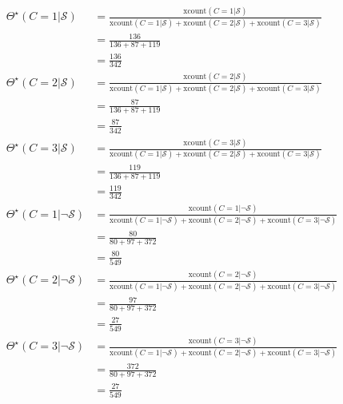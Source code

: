 \documentclass[review_Solutions]{subfiles}
\begin{document}
\begin{exercise}
\begin{boxedsolution}
\begin{align}
\Theta^\star(C=1 | \mathcal{S}) &= \frac{\mbox{xcount}(C=1| \mathcal{S})}{\mbox{xcount}(C=1| \mathcal{S}) + \mbox{xcount}(C=2| \mathcal{S})  + \mbox{xcount}(C=3 | \mathcal{S}) } \nonumber \\
&= \frac{136}{136+87+119} \nonumber \\
&= \frac{136}{342} \nonumber \\
\Theta^\star(C=2 | \mathcal{S}) &= \frac{\mbox{xcount}(C=2| \mathcal{S})}{\mbox{xcount}(C=1| \mathcal{S}) + \mbox{xcount}(C=2| \mathcal{S})  + \mbox{xcount}(C=3|  \mathcal{S}) } \nonumber \\
&= \frac{87}{136+87+119} \nonumber \\
&= \frac{87}{342} \nonumber \\
\Theta^\star(C=3 | \mathcal{S}) &= \frac{\mbox{xcount}(C=3| \mathcal{S})}{\mbox{xcount}(C=1| \mathcal{S}) + \mbox{xcount}(C=2| \mathcal{S})  + \mbox{xcount}(C=3 | \mathcal{S}) } \nonumber \\
&= \frac{119}{136+87+119} \nonumber \\
&= \frac{119}{342} \nonumber \\
\Theta^\star(C=1 | \neg \mathcal{S}) &= \frac{\mbox{xcount}(C=1| \neg\mathcal{S})}{\mbox{xcount}(C=1|\neg \mathcal{S}) + \mbox{xcount}(C=2| \neg\mathcal{S})  + \mbox{xcount}(C=3|\neg  \mathcal{S}) } \nonumber \\
&= \frac{80}{80 + 97 + 372} \nonumber \\
&= \frac{80}{549} \nonumber \\
\Theta^\star(C=2 | \neg \mathcal{S}) &= \frac{\mbox{xcount}(C=2| \neg\mathcal{S})}{\mbox{xcount}(C=1| \neg\mathcal{S}) + \mbox{xcount}(C=2| \neg\mathcal{S})  + \mbox{xcount}(C=3 |\neg \mathcal{S}) } \nonumber \\
&= \frac{97}{80 + 97 + 372} \nonumber \\
&= \frac{27}{549} \nonumber \\
\Theta^\star(C=3 | \neg \mathcal{S}) &= \frac{\mbox{xcount}(C=3| \neg\mathcal{S})}{\mbox{xcount}(C=1| \neg\mathcal{S}) + \mbox{xcount}(C=2| \neg\mathcal{S})  + \mbox{xcount}(C=3 | \neg\mathcal{S}) } \nonumber \\
&= \frac{372}{80 + 97 + 372} \nonumber \\
&= \frac{27}{549} \nonumber 
\end{align}

\end{boxedsolution}

\end{exercise}
\end{document}
